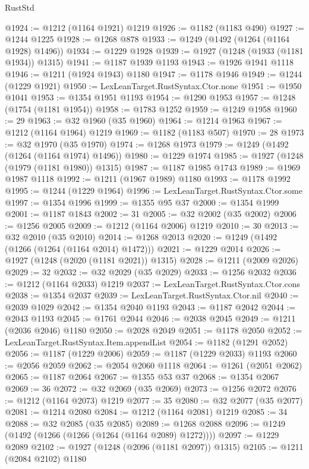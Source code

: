 \begin{lexlean}{RustStd}
\begin{coremodule}
@1924 := @1212 (@1164 @1921) @1219
@1926 := @1182 (@1183 @490)
@1927 := @1244 @1225
@1928 := @1268 @878
@1933 := @1249 (@1492 (@1264 (@1164 @1928) @1496))
@1934 := @1229 @1928
@1939 := @1927 (@1248 (@1933 (@1181 @1934)) @1315)
@1941 := @1187 @1939 @1193
@1943 := @1926 @1941 @1118
@1946 := @1211 (@1924 @1943) @1180
@1947 := @1178 @1946
@1949 := @1244 (@1229 @1921)
@1950 := LexLeanTarget.RustSyntax.Ctor.none
@1951 := @1950 @1041
@1953 := @1354 @1951 @1193
@1954 := @1290 @1953
@1957 := @1248 (@1754 (@1181 @1954))
@1958 := @1783 @1252
@1959 := @1249 @1958
@1960 := 29
@1963 := @32 @1960 (@35 @1960)
@1964 := @1214 @1963
@1967 := @1212 (@1164 @1964) @1219
@1969 := @1182 (@1183 @507)
@1970 := 28
@1973 := @32 @1970 (@35 @1970)
@1974 := @1268 @1973
@1979 := @1249 (@1492 (@1264 (@1164 @1974) @1496))
@1980 := @1229 @1974
@1985 := @1927 (@1248 (@1979 (@1181 @1980)) @1315)
@1987 := @1187 @1985 @1743
@1989 := @1969 @1987 @1118
@1992 := @1211 (@1967 @1989) @1180
@1993 := @1178 @1992
@1995 := @1244 (@1229 @1964)
@1996 := LexLeanTarget.RustSyntax.Ctor.some
@1997 := @1354 @1996
@1999 := @1355 @95 @37
@2000 := @1354 @1999
@2001 := @1187 @1843
@2002 := 31
@2005 := @32 @2002 (@35 @2002)
@2006 := @1256 @2005
@2009 := @1212 (@1164 @2006) @1219
@2010 := 30
@2013 := @32 @2010 (@35 @2010)
@2014 := @1268 @2013
@2020 := @1249 (@1492 (@1266 (@1264 (@1164 @2014) @1472)))
@2021 := @1229 @2014
@2026 := @1927 (@1248 (@2020 (@1181 @2021)) @1315)
@2028 := @1211 (@2009 @2026)
@2029 := 32
@2032 := @32 @2029 (@35 @2029)
@2033 := @1256 @2032
@2036 := @1212 (@1164 @2033) @1219
@2037 := LexLeanTarget.RustSyntax.Ctor.cons
@2038 := @1354 @2037
@2039 := LexLeanTarget.RustSyntax.Ctor.nil
@2040 := @2039 @1029
@2042 := @1354 @2040 @1193
@2043 := @1187 @2042
@2044 := @2043 @1193
@2045 := @1761 @2044
@2046 := @2038 @2045
@2049 := @1211 (@2036 @2046) @1180
@2050 := @2028 @2049
@2051 := @1178 @2050
@2052 := LexLeanTarget.RustSyntax.Item.appendList
@2054 := @1182 (@1291 @2052)
@2056 := @1187 (@1229 @2006)
@2059 := @1187 (@1229 @2033) @1193
@2060 := @2056 @2059
@2062 := @2054 @2060 @1118
@2064 := @1261 (@2051 @2062)
@2065 := @1187 @2064
@2067 := @1355 @53 @37
@2068 := @1354 @2067
@2069 := 36
@2072 := @32 @2069 (@35 @2069)
@2073 := @1256 @2072
@2076 := @1212 (@1164 @2073) @1219
@2077 := 35
@2080 := @32 @2077 (@35 @2077)
@2081 := @1214 @2080
@2084 := @1212 (@1164 @2081) @1219
@2085 := 34
@2088 := @32 @2085 (@35 @2085)
@2089 := @1268 @2088
@2096 := @1249 (@1492 (@1266 (@1266 (@1264 (@1164 @2089) @1272))))
@2097 := @1229 @2089
@2102 := @1927 (@1248 (@2096 (@1181 @2097)) @1315)
@2105 := @1211 (@2084 @2102) @1180

\end{coremodule}
\end{lexlean}
